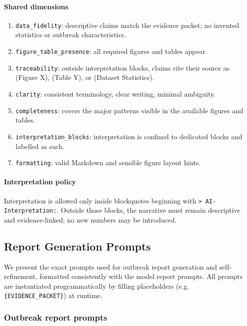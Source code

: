 \paragraph{Shared dimensions}
\vspace{-4pt}
\begin{enumerate}[leftmargin=*, itemsep=-2pt]
    \item \texttt{data\_fidelity}: descriptive claims match the evidence packet; no invented statistics or outbreak characteristics.
    \item \texttt{figure\_table\_presence}: all required figures and tables appear.
    \item \texttt{traceability}: outside interpretation blocks, claims cite their source as (Figure X), (Table Y), or (Dataset Statistics).
    \item \texttt{clarity}: consistent terminology, clear writing, minimal ambiguity.
    \item \texttt{completeness}: covers the major patterns visible in the available figures and tables.
    \item \texttt{interpretation\_blocks}: interpretation is confined to dedicated blocks and labelled as such.
    \item \texttt{formatting}: valid Markdown and sensible figure layout hints.
\end{enumerate}

\paragraph{Interpretation policy}
Interpretation is allowed only inside blockquotes beginning with \texttt{> AI-Interpretation:}.
Outside those blocks, the narrative must remain descriptive and evidence-linked; no new numbers may be introduced.

\subsection{Report Generation Prompts}
\label{app:report_generation_prompts_outbreaks}

We present the exact prompts used for outbreak report generation and self-refinement, formatted consistently with the model report prompts.
All prompts are instantiated programmatically by filling placeholders (e.g. \texttt{\{EVIDENCE\_PACKET\}}) at runtime.


\subsubsection*{Outbreak report prompts}

